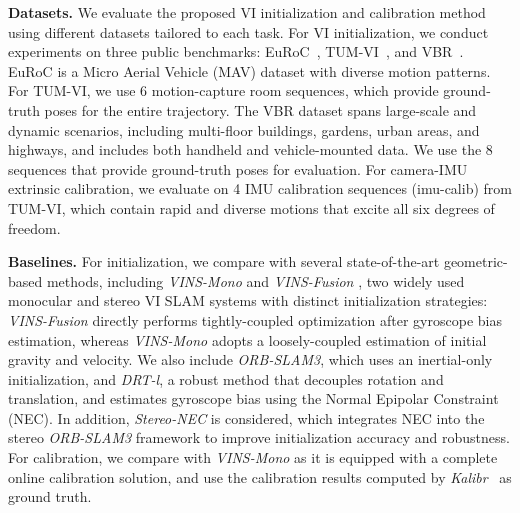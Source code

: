 \noindent\textbf{Datasets.} 
We evaluate the proposed VI initialization and calibration method using different datasets tailored to each task. For VI initialization, we conduct experiments on three public benchmarks: EuRoC~\cite{burri2016euroc}, TUM-VI~\cite{schubert2018tum}, and VBR~\cite{brizi2024vbr}. EuRoC is a Micro Aerial Vehicle (MAV) dataset with diverse motion patterns. For TUM-VI, we use 6 motion-capture room sequences, which provide ground-truth poses for the entire trajectory. The VBR dataset spans large-scale and dynamic scenarios, including multi-floor buildings, gardens, urban areas, and highways, and includes both handheld and vehicle-mounted data. We use the 8 sequences that provide ground-truth poses for evaluation.
For camera-IMU extrinsic calibration, we evaluate on 4 IMU calibration sequences (imu-calib) from TUM-VI, which contain rapid and diverse motions that excite all six degrees of freedom.


\noindent\textbf{Baselines.}
For initialization, we compare with several state-of-the-art geometric-based methods, including \textit{VINS-Mono} and \textit{VINS-Fusion} \cite{qin2018vins}, two widely used monocular and stereo VI SLAM systems with distinct initialization strategies: \textit{VINS-Fusion} directly performs tightly-coupled optimization after gyroscope bias estimation, whereas \textit{VINS-Mono} adopts a loosely-coupled estimation of initial gravity and velocity. We also include \textit{ORB-SLAM3}\cite{campos2021orb}, which uses an inertial-only initialization, and \textit{DRT-l}\cite{he2023rotation}, a robust method that decouples rotation and translation, and estimates gyroscope bias using the Normal Epipolar Constraint (NEC). In addition, \textit{Stereo-NEC}\cite{wang2024stereo} is considered, which integrates NEC into the stereo \textit{ORB-SLAM3} framework to improve initialization accuracy and robustness.  
For calibration, we compare with \textit{VINS-Mono} as it is equipped with a complete online calibration solution, and use the calibration results computed by \textit{Kalibr}~\cite{furgale2013unified} as ground truth.

